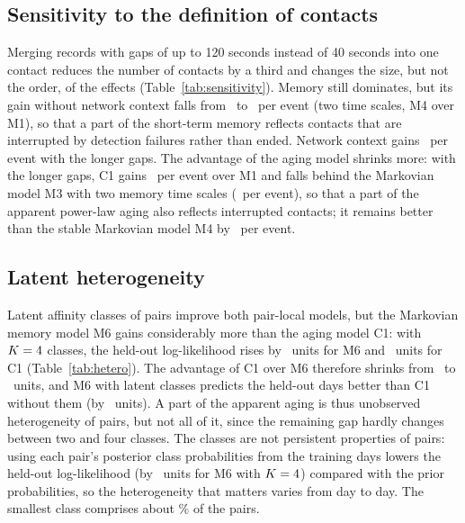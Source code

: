 \subsection{Sensitivity to the definition of contacts}\label{sec:sensitivity}
Merging records with gaps of up to 120 seconds instead of 40 seconds into one contact reduces the number of contacts by a third and changes the size, but not the order, of the effects (Table~\ref{tab:sensitivity}).
Memory still dominates, but its gain without network context falls from \GainMemoryAloneTwo\ to \GainMemoryAloneLong\ per event (two time scales, M4 over M1), so that a part of the short-term memory reflects contacts that are interrupted by detection failures rather than ended.
Network context gains \GainNetworkLong\ per event with the longer gaps.
The advantage of the aging model shrinks more: with the longer gaps, C1 gains \ConeLong\ per event over M1 and falls behind the Markovian model M3 with two memory time scales (\MthreeLong\ per event), so that a part of the apparent power-law aging also reflects interrupted contacts; it remains better than the stable Markovian model M4 by \ConeOverMfourLong\ per event.

\begin{table}[t]
\caption{Sensitivity to the definition of contacts: held-out log-likelihood and improvement per event relative to M1 with gaps of up to 120 seconds merged into one contact, and the improvement per event with gaps of up to 40 seconds (Table~\ref{tab:fits}) for comparison.}
\label{tab:sensitivity}

\end{table}

\subsection{Latent heterogeneity}\label{sec:heterogeneity}
Latent affinity classes of pairs improve both pair-local models, but the Markovian memory model M6 gains considerably more than the aging model C1: with $K = 4$ classes, the held-out log-likelihood rises by \HetGainMsix\ units for M6 and \HetGainCone\ units for C1 (Table~\ref{tab:hetero}).
The advantage of C1 over M6 therefore shrinks from \HetGapNone\ to \HetGapK\ units, and M6 with latent classes predicts the held-out days better than C1 without them (by \HetMsixOverConeNone\ units).
A part of the apparent aging is thus unobserved heterogeneity of pairs, but not all of it, since the remaining gap hardly changes between two and four classes.
The classes are not persistent properties of pairs: using each pair's posterior class probabilities from the training days lowers the held-out log-likelihood (by \HetPosteriorLoss\ units for M6 with $K = 4$) compared with the prior probabilities, so the heterogeneity that matters varies from day to day.
The smallest class comprises about \HetSmallClass\% of the pairs.


